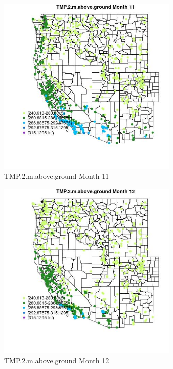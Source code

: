 \begin{figure} 
\centering  
\includegraphics[width=0.77\textwidth]{Code_Outputs/Report_ML_input_PM25_Step4_part_f_de_duplicated_aveswNAs_MapObsMo11TMP2maboveground.jpg} 
\caption{\label{fig:Report_ML_input_PM25_Step4_part_f_de_duplicated_aveswNAsMapObsMo11TMP2maboveground}TMP.2.m.above.ground Month 11} 
\end{figure} 
 

\begin{figure} 
\centering  
\includegraphics[width=0.77\textwidth]{Code_Outputs/Report_ML_input_PM25_Step4_part_f_de_duplicated_aveswNAs_MapObsMo12TMP2maboveground.jpg} 
\caption{\label{fig:Report_ML_input_PM25_Step4_part_f_de_duplicated_aveswNAsMapObsMo12TMP2maboveground}TMP.2.m.above.ground Month 12} 
\end{figure} 
 

